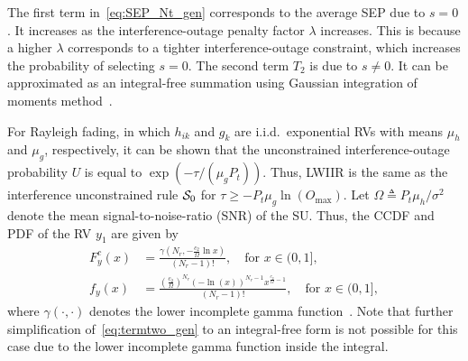 \documentclass[12pt,draftcls,peerreview,onecolumn]{IEEEtran}
\newcommand{\define}{\triangleq}
\newcommand{\nx}{{0}}
\newcommand{\lam}{\lambda}
\newcommand{\mug}{{\mu_{g}}}
\newcommand{\muh}{{\mu_{h}}}
\newcommand{\termtwo}{T_2}
\newcommand{\Nt}{{N_t}}
\newcommand{\Nr}{{N_r}}
\newcommand{\Pt}{{P_t}}
\newcommand{\such}{h}
\newcommand{\puch}{g}
\newcommand{\hk}[1]{{\such_{#1}}}
\newcommand{\gk}[1]{{\puch_{#1}}}
\newcommand{\noisevar}{\sigma^2}
\newcommand{\outmax}{O_{\text{max}}}
\newcommand{\itau}{\tau}
\newcommand{\cone}{c_{1}}
\newcommand{\ctwo}{c_{2}}
\newcommand{\lambym}{\frac{\lam}{\cone}}
\newcommand{\yk}[1]{y_{#1}}
\newcommand{\inlccdfg}[1][]{\exp\left({-{{#1}\itau}/{\left( \mug\Pt\right) }}\right)}
\newcommand{\al}{\ctwo}
\newcommand{\snr}{\Omega}
\newcommand{\albysnr}[1][]{\frac{\al#1}{\snr}}
\newcommand{\un}{U}
\newcommand{\zerosep}{e_0}
\newcommand{\caluncons}{{\cal S_{\text{0}}}}
\newcommand{\ccdfyNr}[1]{\frac{\gamma\left(\Nr,-\albysnr\ln{#1}\right)}{(\Nr-1)!}}
\newcommand{\unccdfy}[2]{\frac{{#1}\,\,\gamma\left(\Nr,-\albysnr\ln{#2}\right)}{(\Nr-1)!}}
\newcommand{\pdfyNr}{\frac{\left(\albysnr\right)^{\Nr}\left(-\ln\left({x}\right)\right)^{\Nr-1}x^{\albysnr[]-1}}{(\Nr-1)!}} %
\newcommand{\ytimespdfyNr}{\left(\ln\left(\frac{1}{x}\right)\right)^{\Nr-1}x^{\albysnr[]}} %
\newcommand{\ypluslamtimespdfyNr}{\left(\ln\left(\frac{1}{x+\lambym}\right)\right)^{\Nr-1}\left(x+\lambym\right)^{\albysnr[]}} %
\newcommand{\pdfyNrgen}[1]{f_{y}\left(#1\right)} %
\newcommand{\ccdfyrv}[1]{ F^{c}_{y}\left(#1 \right) }
\begin{document}
The first term in~\eqref{eq:SEP_Nt_gen} corresponds to the average SEP due to $s=\nx$. It increases as the interference-outage penalty factor $\lam$ increases. This is because a higher $\lam$ corresponds to a tighter interference-outage constraint, which increases the probability of selecting $s=\nx$. The second term $\termtwo$ is due to $s \neq \nx$.
It can be approximated as an integral-free summation using Gaussian integration of moments method~\cite[pp. 921-922]{abramowitz_stegun}.
%

For Rayleigh fading, in which $\hk{ik}$ and $\gk{k}$ are i.i.d.\ exponential RVs with means $\muh$ and $\mug$, respectively, it can be shown that the unconstrained interference-outage probability $\un$ is equal to $\inlccdfg[]$. Thus, LWIIR is the same as the interference unconstrained rule $\caluncons$ for $\itau\geq-\Pt\mug\ln\left(\outmax\right)$.  Let $\snr\define\Pt\muh/\noisevar$ denote the mean signal-to-noise-ratio (SNR) of the SU. Thus, the CCDF and PDF of the RV $\yk{1}$ are given by 
\begin{align}
\label{eq:ccdfyNr}
\ccdfyrv{x} &= \ccdfyNr{x}, \quad \text{for}\,\, x \in (0,1],\\
\label{eq:pdfyNr}
\pdfyNrgen{x} &= \pdfyNr, \quad \text{for}\,\,  x \in (0,1],
\end{align}
where $\gamma(\cdot,\cdot)$ denotes the lower incomplete gamma function~\cite[(8.350.1)]{gradshteyn00_book}. Note that further simplification of~\eqref{eq:termtwo_gen} to an integral-free form is not possible for this case due to the lower incomplete gamma function inside the integral.  
%
\end{document}

